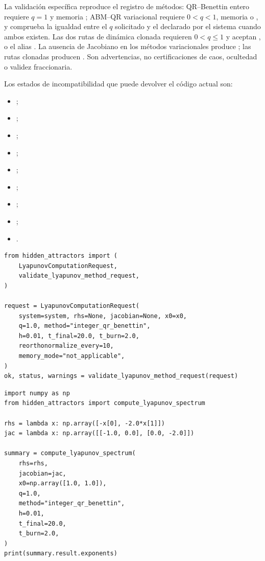 La validación específica reproduce el registro de métodos: QR--Benettin
entero requiere \(q=1\) y memoria ; ABM--QR
variacional requiere \(0<q<1\), memoria  o
, y comprueba la igualdad entre el \(q\) solicitado y el
declarado por el sistema cuando ambos existen. Las dos rutas de dinámica
clonada requieren \(0<q\leq1\) y aceptan
,  o el alias
. La ausencia de Jacobiano en los
métodos variacionales produce
; las rutas
clonadas producen . Son
advertencias, no certificaciones de caos, ocultedad o validez fraccionaria.

Los estados de incompatibilidad que puede devolver el código actual son:
\begin{itemize}
  \item {};
  \item {};
  \item {};
  \item {};
  \item {};
  \item {};
  \item {};
  \item {};
  \item {}.
\end{itemize}

\begin{verbatim}
from hidden_attractors import (
    LyapunovComputationRequest,
    validate_lyapunov_method_request,
)

request = LyapunovComputationRequest(
    system=system, rhs=None, jacobian=None, x0=x0,
    q=1.0, method="integer_qr_benettin",
    h=0.01, t_final=20.0, t_burn=2.0,
    reorthonormalize_every=10,
    memory_mode="not_applicable",
)
ok, status, warnings = validate_lyapunov_method_request(request)
\end{verbatim}

\begin{verbatim}
import numpy as np
from hidden_attractors import compute_lyapunov_spectrum

rhs = lambda x: np.array([-x[0], -2.0*x[1]])
jac = lambda x: np.array([[-1.0, 0.0], [0.0, -2.0]])

summary = compute_lyapunov_spectrum(
    rhs=rhs,
    jacobian=jac,
    x0=np.array([1.0, 1.0]),
    q=1.0,
    method="integer_qr_benettin",
    h=0.01,
    t_final=20.0,
    t_burn=2.0,
)
print(summary.result.exponents)
\end{verbatim}

